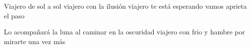 
    Viajero de sol a sol
    viajero con la ilusión\newline %
    viajero te está esperando\newline %
    vamos aprieta el paso
\endverse

\beginverse
    Lo acompañará la luna
    al caminar en la oscuridad
    viajero con frio y hambre
    por mirarte una vez más
\endverse

